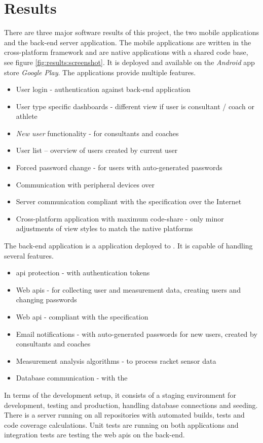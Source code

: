 \chapter{Results}
There are three major software results of this project, the two mobile applications and the back-end server application.
The mobile applications are written in the cross-platform framework  and are native applications with a shared code base, see figure \ref{fig:results:screenshot}.
It is deployed and available on the \textit{Android} app store \textit{Google Play}.
The applications provide multiple features.


\begin{itemize}
\item User login - authentication against back-end application
\item User type specific dashboards - different view if user is consultant / coach or athlete
\item \textit{New user} functionality - for consultants and coaches
\item User list – overview of users created by current user
\item Forced password change - for users with auto-generated passwords
\item Communication with peripheral devices over 
\item Server communication compliant with the  specification over the Internet
\item Cross-platform application with maximum code-share - only minor adjustments of view styles to match the native platforms
\end{itemize}

The back-end application is a  application deployed to .
It is capable of handling several features.

\begin{itemize}
\item \Gls{api} protection - with authentication tokens
\item Web \glspl{api} - for collecting user and measurement data, creating users and changing passwords
\item Web \gls{api} - compliant with the  specification
\item Email notifications - with auto-generated passwords for new users, created by consultants and coaches
\item Measurement analysis algorithms - to process racket sensor data
\item Database communication - with the  
\end{itemize}

In terms of the development setup, it consists of a staging environment for development, testing and production, handling database connections and seeding.
There is a  server running on all repositories with automated builds, tests and code coverage calculations.
Unit tests are running on both applications and integration tests are testing the web \glspl{api} on the back-end.
